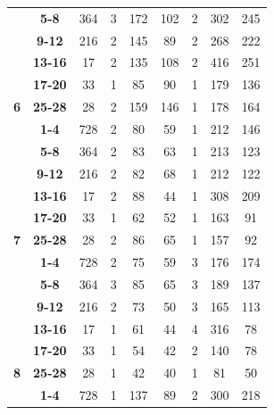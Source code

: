 \begin{table}
{\begin{tabular}{|c@{~}|c@{~}|c@{~}|c@{~}|c@{~}|c@{~}|c@{~}|c@{~}|c|}
 & \textbf{5-8} & 364 & 3 & 172 & 102 & \cellcolor[HTML]{EFEFEF}2 & 302 & 245 \\ \cline{2-9} 
 & \textbf{9-12} & 216 & \cellcolor[HTML]{EFEFEF}2 & 145 & 89 & \cellcolor[HTML]{EFEFEF}2 & 268 & 222 \\ \cline{2-9} 
 & \textbf{13-16} & 17 & \cellcolor[HTML]{EFEFEF}2 & 135 & 108 & \cellcolor[HTML]{EFEFEF}2 & 416 & 251 \\ \cline{2-9} 
 & \textbf{17-20} & 33 & \cellcolor[HTML]{C0C0C0}1 & 85 & 90 & \cellcolor[HTML]{C0C0C0}1 & 179 & 136 \\ \cline{2-9} 
\multirow{-6}{*}{\textbf{6}} & \textbf{25-28} & 28 & \cellcolor[HTML]{EFEFEF}2 & 159 & 146 & \cellcolor[HTML]{C0C0C0}1 & 178 & 164 \\ \hline
 & \textbf{1-4} & 728 & \cellcolor[HTML]{EFEFEF}2 & 80 & 59 & \cellcolor[HTML]{C0C0C0}1 & 212 & 146 \\ \cline{2-9} 
 & \textbf{5-8} & 364 & \cellcolor[HTML]{EFEFEF}2 & 83 & 63 & \cellcolor[HTML]{C0C0C0}1 & 213 & 123 \\ \cline{2-9} 
 & \textbf{9-12} & 216 & \cellcolor[HTML]{EFEFEF}2 & 82 & 68 & \cellcolor[HTML]{C0C0C0}1 & 212 & 122 \\ \cline{2-9} 
 & \textbf{13-16} & 17 & \cellcolor[HTML]{EFEFEF}2 & 88 & 44 & \cellcolor[HTML]{C0C0C0}1 & 308 & 209 \\ \cline{2-9} 
 & \textbf{17-20} & 33 & \cellcolor[HTML]{C0C0C0}1 & 62 & 52 & \cellcolor[HTML]{C0C0C0}1 & 163 & 91 \\ \cline{2-9} 
\multirow{-6}{*}{\textbf{7}} & \textbf{25-28} & 28 & \cellcolor[HTML]{EFEFEF}2 & 86 & 65 & \cellcolor[HTML]{C0C0C0}1 & 157 & 92 \\ \hline
 & \textbf{1-4} & 728 & \cellcolor[HTML]{EFEFEF}2 & 75 & 59 & 3 & 176 & 174 \\ \cline{2-9} 
 & \textbf{5-8} & 364 & 3 & 85 & 65 & 3 & 189 & 137 \\ \cline{2-9} 
 & \textbf{9-12} & 216 & \cellcolor[HTML]{EFEFEF}2 & 73 & 50 & 3 & 165 & 113 \\ \cline{2-9} 
 & \textbf{13-16} & 17 & \cellcolor[HTML]{C0C0C0}1 & 61 & 44 & 4 & 316 & 78 \\ \cline{2-9} 
 & \textbf{17-20} & 33 & \cellcolor[HTML]{C0C0C0}1 & 54 & 42 & \cellcolor[HTML]{EFEFEF}2 & 140 & 78 \\ \cline{2-9} 
\multirow{-6}{*}{\textbf{8}} & \textbf{25-28} & 28 & \cellcolor[HTML]{C0C0C0}1 & 42 & 40 & \cellcolor[HTML]{C0C0C0}1 & 81 & 50 \\ \hline
 & \textbf{1-4} & 728 & \cellcolor[HTML]{C0C0C0}1 & 137 & 89 & \cellcolor[HTML]{EFEFEF}2 & 300 & 218 \\ \cline{2-9} 

\end{tabular}}
\end{table}

